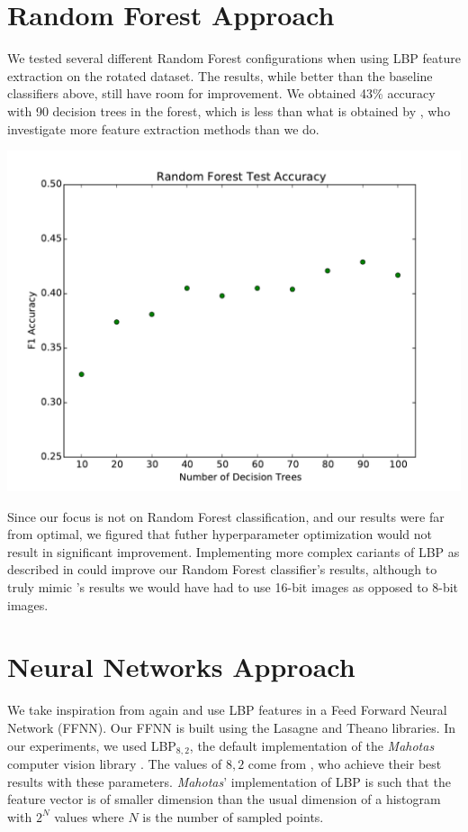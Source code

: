 \begin{multicols}{2}
\section{Random Forest Approach}
We tested several different Random Forest configurations when using LBP feature extraction on the rotated dataset. The results, while better than the baseline classifiers above, still have room for improvement. We obtained 43\% accuracy with 90 decision trees in the forest, which is less than what is obtained by \citet{kylberg2011virus}, who investigate more feature extraction methods than we do. 

\begin{Figure}
	\centering
	\includegraphics[width=1.0\linewidth]{images/random_forest_results.pdf}
	\label{fig:random_forest}
\end{Figure}

Since our focus is not on Random Forest classification, and our results were far from optimal, we figured that futher hyperparameter optimization would not result in significant improvement. Implementing more complex cariants of LBP as described in \citet{kylberg2011virus} could improve our Random Forest classifier's results, although to truly mimic \citet{kylberg2011virus}'s results we would have had to use 16-bit images as opposed to 8-bit images.

\section{Neural Networks Approach}
We take inspiration from \citet{kylberg2011virus} again and use LBP features in a Feed Forward Neural Network (FFNN). Our FFNN is built using the Lasagne and Theano \citet{Bastien-Theano-2012, bergstra+al:2010-scipy} libraries. In our experiments, we used LBP$_{8,2}$, the default implementation of the \emph{Mahotas} computer vision library \citet{coelho2012mahotas}. The values of $8,2$ come from \citet{kylberg2011virus}, who achieve their best results with these parameters. \emph{Mahotas}' implementation of LBP is such that the feature vector is of smaller dimension than the usual dimension of a histogram with $2^N$ values where $N$ is the number of sampled points.


\end{multicols}
